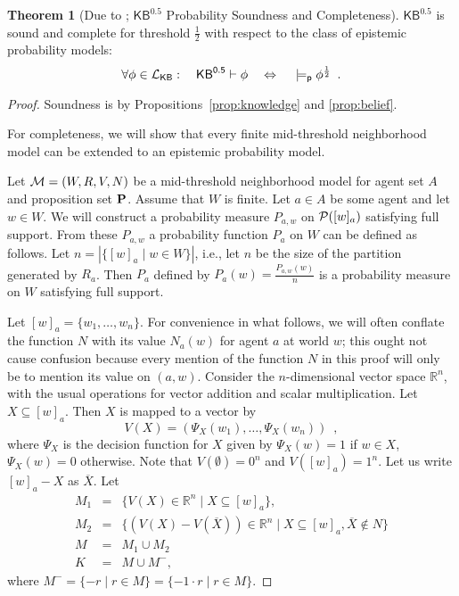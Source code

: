 \documentclass[12pt]{article}
\theoremstyle{definition}
\newtheorem{theorem}{Theorem}[section]
\newcommand{\Ree}{\mathbb{R}}  %
\newcommand{\pow}{{\cal P}}    %
\newcommand{\M}{{\cal M}}      %
\newcommand{\Prop}{{\bf P}}    %
\newcommand{\Lang}{{\cal L}}   %
\newcommand{\KB}{{\mathsf{KB}}}                        %
\newcommand{\KBeq}{{\mathsf{KB}^{\mathsf{0.5}}}}       %
\newcommand{\modelsp}{\models_{\mathsf{p}}}                  %
\begin{document}
\begin{theorem}[Due to \cite{Lenzen1980:gwuw}; $\KBeq$
  Probability Soundness and Completeness]
  \label{theorem:KBeq-probability-completeness}\label{theorem:lenzen}
  $\KBeq$ is sound and complete for threshold $\frac12$ with respect to the class of epistemic
  probability models:
  \[
  \textstyle 
  \forall\phi\in\Lang_\KB:\quad
  \KBeq\vdash\phi
   \quad\Leftrightarrow\quad
  {}\modelsp\phi^{\frac 12} \enspace.
  \]
\end{theorem}
\begin{proof}
  Soundness is by Propositions~\ref{prop:knowledge} and \ref{prop:belief}.

  For completeness, we will show that every finite mid-threshold neighborhood model can be
  extended to an epistemic probability model.

  Let $\M = (W,R,V,N)$ be a mid-threshold neighborhood model for agent 
  set $A$ and proposition set $\Prop$. 
  Assume that $W$ is finite. Let $a \in A$ be some agent and let $w \in W$. 
  We will construct a probability measure $P_{a,w}$ on $\pow([w]_a)$ satisfying full support. 
  From these $P_{a,w}$ a probability function $P_a$ on $W$ can be defined as follows. 
  Let $n = | \{ [w]_a \mid w \in W \}|$, i.e., let $n$ be the size of the partition 
  generated by $R_a$. Then $P_a$ defined by $P_a(w) = \frac{P_{a,w}(w)}{n}$ is a probability 
  measure on $W$ satisfying full support. 

  Let $[w]_a = \{ w_1, \ldots, w_n \}$.  For convenience in what
  follows, we will often conflate the function $N$ with its value
  $N_a(w)$ for agent $a$ at world $w$; this ought not cause confusion
  because every mention of the function $N$ in this proof will only be
  to mention its value on $(a,w)$. Consider the $n$-dimensional vector
  space $\Ree^n$, with the usual operations for vector addition and
  scalar multiplication.  Let $X \subseteq [w]_a$. Then $X$ is mapped
  to a vector by
  \[
  V(X) = (\Psi_X(w_1), \ldots, \Psi_X(w_n))\enspace,
  \]
  where $\Psi_X$ is the decision function for $X$ given by $\Psi_X(w)
  = 1$ if $w \in X$, $\Psi_X(w) = 0$ otherwise. Note that
  $V(\emptyset) = 0^n$ and $V([w]_a) = 1^n$.  Let us write $[w]_a - X$
  as $\overline{X}$.  Let
  \begin{eqnarray*} 
    M_1 & = & \{ V(X) \in \Ree^n \mid X \subseteq [w]_a \}, \\
    M_2 & = & \{ (V(X) - V(\overline{X})) \in \Ree^n \mid X \subseteq [w]_a, 
                  \overline{X} \notin N \} \\
    M & = & M_1 \cup M_2 \\
    K & = & M \cup M^-, 
  \end{eqnarray*}
  where $M^- =  \{ -r \mid r \in M \} = \{ -1 \cdot r \mid r \in M \}$.


\end{proof}
\end{document}
